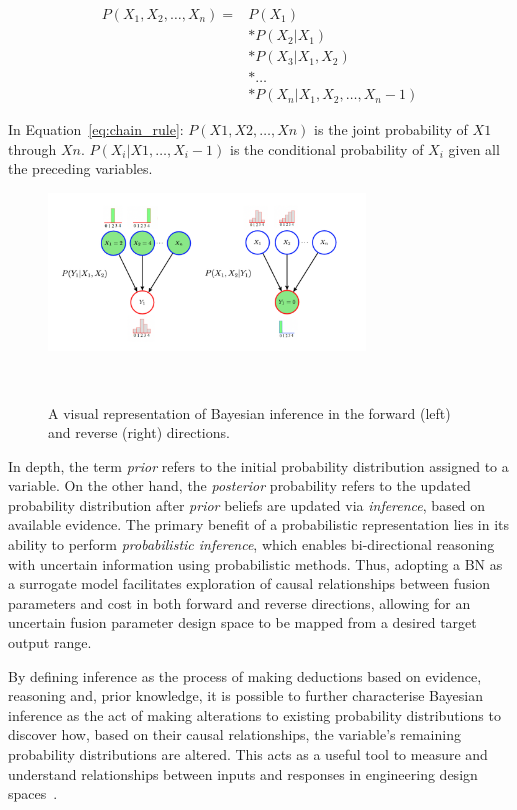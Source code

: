 \documentclass[journal]{IEEEtran}
\begin{document}
\begin{align}
    P(X_1, X_2, \ldots, X_n) = & P(X_1) \nonumber \\
    & * P(X_2 | X_1) \nonumber \\
    & * P(X_3 | X_1, X_2) \nonumber \\
    & * \ldots \nonumber \\
    & * P(X_n | X_1, X_2, \ldots, X_n-1)
    \label{eq:chain_rule}
\end{align}
    
In Equation~\ref{eq:chain_rule}: $P(X1, X2, \ldots, Xn)$ is the joint probability of $X1$ through $Xn$. $P(X_i | X1, \ldots, X_i-1)$ is the conditional probability of $X_i$ given all the preceding variables.



\begin{figure}[t]
    \centering
    \includegraphics[width=0.75\textwidth]{figures/methodology/inference_F&R_diagram.png}
    \caption{A visual representation of Bayesian inference in the forward (left) and reverse (right) directions.}~\label{fig:inference_F&R_diagram}
\end{figure}

In depth, the term \textit{prior} refers to the initial probability distribution assigned to a variable. On the other hand, the \textit{posterior} probability refers to the updated probability distribution after \textit{prior} beliefs are updated via \textit{inference}, based on available evidence. The primary benefit of a probabilistic representation lies in its ability to perform \textit{probabilistic inference}, which enables bi-directional reasoning with uncertain information using probabilistic methods. Thus, adopting a BN as a surrogate model facilitates exploration of causal relationships between fusion parameters and cost in both forward and reverse directions, allowing for an uncertain fusion parameter design space to be mapped from a desired target output range. 

By defining inference as the process of making deductions based on evidence, reasoning and, prior knowledge, it is possible to further characterise Bayesian inference as the act of making alterations to existing probability distributions to discover how, based on their causal relationships, the variable's remaining probability distributions are altered. This acts as a useful tool to measure and understand relationships between inputs and responses in engineering design spaces~\cite{Koller2009}. 
\end{document}

